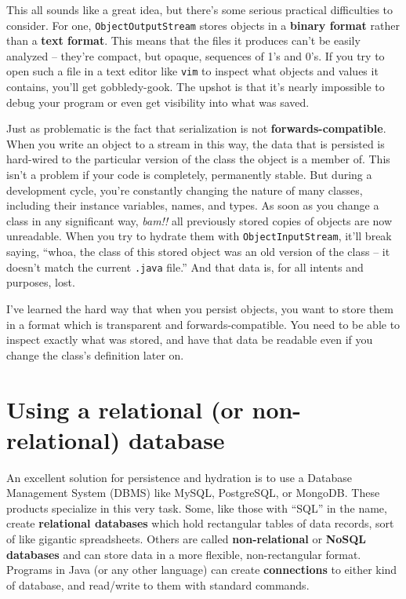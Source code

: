 This all sounds like a great idea, but there's some serious practical
difficulties to consider. For one, \texttt{ObjectOutputStream} stores objects
in a \textbf{binary format} rather than a \textbf{text format}. This means
that the files it produces can't be easily analyzed -- they're compact, but
opaque, sequences of 1's and 0's. If you try to open such a file in a text
editor like \texttt{vim} to inspect what objects and values it contains,
you'll get gobbledy-gook. The upshot is that it's nearly impossible to debug
your program or even get visibility into what was saved.

Just as problematic is the fact that serialization is not
\textbf{forwards-compatible}. When you write an object to a stream in this
way, the data that is persisted is hard-wired to the particular version of the
class the object is a member of. This isn't a problem if your code is
completely, permanently stable. But during a development cycle, you're
constantly changing the nature of many classes, including their instance
variables, names, and types. As soon as you change a class in any significant
way, \textit{bam!!} all previously stored copies of objects are now
unreadable. When you try to hydrate them with \texttt{ObjectInputStream},
it'll break saying, ``whoa, the class of this stored object was an old version
of the class -- it doesn't match the current \texttt{.java} file.'' And that
data is, for all intents and purposes, lost.

I've learned the hard way that when you persist objects, you want to store
them in a format which is transparent and forwards-compatible. You need to be
able to inspect exactly what was stored, and have that data be readable even
if you change the class's definition later on.

\section{Using a relational (or non-relational) database}

An excellent solution for persistence and hydration is to use a Database
Management System (DBMS) like MySQL, PostgreSQL, or MongoDB. These products
specialize in this very task. Some, like those with ``SQL'' in the name,
create \textbf{relational databases} which hold rectangular tables of data
records, sort of like gigantic spreadsheets. Others are called
\textbf{non-relational} or \textbf{NoSQL databases} and can store data in a
more flexible, non-rectangular format. Programs in Java (or any other
language) can create \textbf{connections} to either kind of database, and
read/write to them with standard commands.

